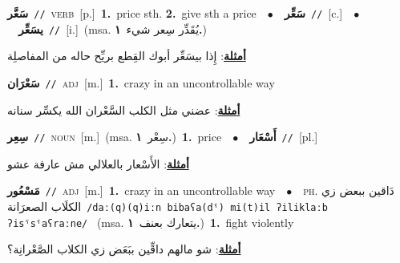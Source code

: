 \documentclass[10pt,a4paper,twoside]{article} %
\begin{document}
\begin{multicols}{2}
{\setlength\topsep{0pt}\textbf{\foreignlanguage{arabic}{سَعَّر}}\ {\color{gray}\texttt{//}\color{black}}\ \textsc{verb}\ [p.]\ \textbf{1.}~price sth.  \textbf{2.}~give sth a price\ \ $\bullet$\ \ \setlength\topsep{0pt}\textbf{\foreignlanguage{arabic}{سَعِّر}}\ {\color{gray}\texttt{//}\color{black}}\ [c.]\ \ $\bullet$\ \ \setlength\topsep{0pt}\textbf{\foreignlanguage{arabic}{يسَعِّر}}\ {\color{gray}\texttt{//}\color{black}}\ [i.]\ \color{gray}(msa. \foreignlanguage{arabic}{يُقَدِّر سِعر شيء}~\foreignlanguage{arabic}{\textbf{١.}})\color{black}\  \begin{flushright}\color{gray}\foreignlanguage{arabic}{\textbf{\underline{\foreignlanguage{arabic}{أمثلة}}}: إِذا بيسَعِّر أبوك القِطع بريِّح حاله من المفاصلِة}\end{flushright}\color{black}} \vspace{2mm}

{\setlength\topsep{0pt}\textbf{\foreignlanguage{arabic}{سَعْرَان}}\ {\color{gray}\texttt{//}\color{black}}\ \textsc{adj}\ [m.]\ \textbf{1.}~crazy in an uncontrollable way\  \begin{flushright}\color{gray}\foreignlanguage{arabic}{\textbf{\underline{\foreignlanguage{arabic}{أمثلة}}}: عضني مثل الكلب السَّعْران الله يكسِّر سنانه}\end{flushright}\color{black}} \vspace{2mm}

{\setlength\topsep{0pt}\textbf{\foreignlanguage{arabic}{سِعِر}}\ {\color{gray}\texttt{//}\color{black}}\ \textsc{noun}\ [m.]\ \color{gray}(msa. \foreignlanguage{arabic}{سِعْر}~\foreignlanguage{arabic}{\textbf{١.}})\color{black}\ \textbf{1.}~price\ \ $\bullet$\ \ \setlength\topsep{0pt}\textbf{\foreignlanguage{arabic}{أَسْعَار}}\ {\color{gray}\texttt{//}\color{black}}\ [pl.]\  \begin{flushright}\color{gray}\foreignlanguage{arabic}{\textbf{\underline{\foreignlanguage{arabic}{أمثلة}}}: الأَسْعار بالعلالي مش عارفة عشو}\end{flushright}\color{black}} \vspace{2mm}

{\setlength\topsep{0pt}\textbf{\foreignlanguage{arabic}{مَسْعُور}}\ {\color{gray}\texttt{//}\color{black}}\ \textsc{adj}\ [m.]\ \textbf{1.}~crazy in an uncontrollable way\ \ $\bullet$\ \ \textsc{ph.} \color{gray} \foreignlanguage{arabic}{دَاقين ببعض زي الكلَاب الصعرَانة}\color{black}\ {\color{gray}\texttt{/{\sffamily daː(q)(q)iːn bibaʕa(dˤ) mi(t)il ʔiliklaːb ʔisˤsˤaʕraːne}/}\color{black}}\ \color{gray} (msa. \foreignlanguage{arabic}{يتعارك بعنف}~\foreignlanguage{arabic}{\textbf{١.}})\color{black}\ \textbf{1.}~fight violently\  \begin{flushright}\color{gray}\foreignlanguage{arabic}{\textbf{\underline{\foreignlanguage{arabic}{أمثلة}}}: شو مالهم داقِّين ببَعَض زي الكلاب الصَّعْرانِة؟}\end{flushright}\color{black}} \vspace{2mm}


\end{multicols}
\end{document}
